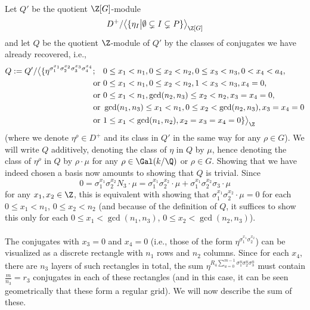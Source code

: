\paragraph*{}
Let $Q'$ be the quotient $\Z[G]$-module $$D^+/\big\langle \{\eta_I \big\vert \emptyset \subsetneq I \subsetneq P \}\big\rangle_{\Z[G]}$$
and let $Q$ be the quotient $\Z$-module of $Q'$ by the classes of conjugates we have already recovered, i.e.,
\begin{align*}
Q:=Q'/\big\langle \{\eta^{\sigma_1^{x_1}\sigma_2^{x_2}\sigma_3^{x_3}\sigma_4^{x_4}}; \quad & 0\leq x_1< n_1, 0\leq x_2<n_2, 0\leq x_3<n_3,0< x_4<a_4,\\
\text { or }& 0\leq x_1< n_1, 0\leq x_2<n_2, 1< x_3<n_3,x_4=0,\\
\text { or }& 0\leq x_1< n_1, \gcd(n_2,n_3)\leq x_2<n_2, x_3=x_4=0,\\
\text { or }& \gcd(n_1,n_3)\leq x_1< n_1, 0\leq x_2<\gcd(n_2,n_3), x_3=x_4=0\\ 
\text { or }&1\leq x_1 <\gcd(n_1,n_2), x_2=x_3=x_4=0 \}\big\rangle_{\Z}
\end{align*}
(where we denote $\eta^{\rho}\in D^+$ and its class in $Q'$ in the same way for any $\rho\in G$).
We will write $Q$ additively, denoting the class of $\eta$ in $Q$ by $\mu$, hence denoting the class of $\eta^{\rho}$ in $Q$ by $\rho\cdot \mu$ for any $\rho\in\Gal(k/\Q)$ or $\rho\in G$.
Showing that we have indeed chosen a basis now amounts to showing that $Q$ is trivial. Since $$0=\sigma_1^{x_1}\sigma_2^{x_2}N_3\cdot \mu=\sigma_1^{x_1}\sigma_2^{x_2}\cdot \mu+\sigma_1^{x_1}\sigma_2^{x_2}\sigma_3\cdot \mu$$
for any $x_1,x_2\in\Z$,
this is equivalent with showing that $\sigma_1^{x_1}\sigma_2^{x_2}\cdot \mu=0$ for each $0\leq x_1<n_1$, $0\leq x_2<n_2$ (and because of the definition of $Q$, it suffices to show this only for each $0\leq x_1<\gcd(n_1,n_3)$, $0\leq x_2<\gcd(n_2,n_3)$).

\paragraph*{}
The conjugates with $x_3=0$ and $x_4=0$ (i.e., those of the form $\eta^{\sigma_1^{x_1}\sigma_2^{x_2}}$) can be visualized as a discrete rectangle with $n_1$ rows and $n_2$ columns. Since for each $x_4$, there are $n_3$ layers of such rectangles in total, the sum $\eta^{R_4\sum_{u=0}^{m-1}\sigma_1^{u}\sigma_2^{u}\sigma_3^{u}}$ must contain $\frac{m}{n_3}=r_3$ conjugates in each of these rectangles (and in this case, it can be seen geometrically that these form a regular grid). We will now describe the sum of these. 

